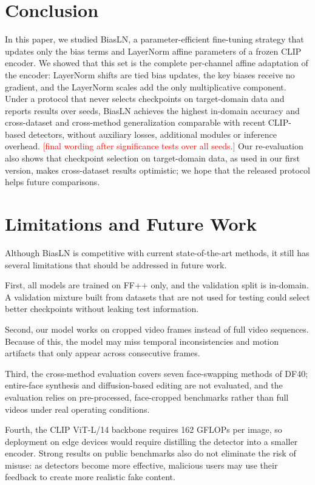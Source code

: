 \documentclass[fonts]{icst}
\newif\ifpending\pendingtrue
\newcommand{\pending}[1]{\ifpending\textcolor{red}{[#1]}\else\errmessage{pending text left: #1}\fi}
\begin{document}
\section{Conclusion}

In this paper, we studied BiasLN, a parameter-efficient fine-tuning strategy that updates only the bias terms and LayerNorm affine parameters of a frozen CLIP encoder.
We showed that this set is the complete per-channel affine adaptation of the encoder: LayerNorm shifts are tied bias updates, the key biases receive no gradient, and the LayerNorm scales add the only multiplicative component.
Under a protocol that never selects checkpoints on target-domain data and reports results over seeds, BiasLN achieves the highest in-domain accuracy and cross-dataset and cross-method generalization comparable with recent CLIP-based detectors, without auxiliary losses, additional modules or inference overhead. \pending{final wording after significance tests over all seeds.}
Our re-evaluation also shows that checkpoint selection on target-domain data, as used in our first version, makes cross-dataset results optimistic; we hope that the released protocol helps future comparisons.


\section{Limitations and Future Work}
\label{sec:limits}
Although BiasLN is competitive with current state-of-the-art methods, it still has several limitations that should be addressed in future work.

First, all models are trained on FF++ only, and the validation split is in-domain. A validation mixture built from datasets that are not used for testing could select better checkpoints without leaking test information.

Second, our model works on cropped video frames instead of full video sequences.
Because of this, the model may miss temporal inconsistencies and motion artifacts that only appear across consecutive frames.

Third, the cross-method evaluation covers seven face-swapping methods of DF40; entire-face synthesis and diffusion-based editing are not evaluated, and the evaluation relies on pre-processed, face-cropped benchmarks rather than full videos under real operating conditions.

Fourth, the CLIP ViT-L/14 backbone requires 162 GFLOPs per image, so deployment on edge devices would require distilling the detector into a smaller encoder. Strong results on public benchmarks also do not eliminate the risk of misuse: as detectors become more effective, malicious users may use their feedback to create more realistic fake content.
\end{document}
